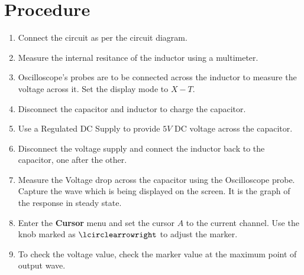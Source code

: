 \documentclass[12pt]{article}
\begin{document}
\section{Procedure}
\begin{enumerate}
    \item Connect the circuit as per the circuit diagram.
    \item Measure the internal resitance of the inductor using a multimeter.
    \item Oscilloscope's probes are to be connected across the inductor to measure the voltage across it. Set the display mode to $X - T$.
    \item Disconnect the capacitor and inductor to charge the capacitor.
    \item Use a Regulated DC Supply to provide $5 V$ DC voltage across the capacitor.
    \item Disconnect the voltage supply and connect the inductor back to the capacitor, one after the other. 
    \item Measure the Voltage drop across the capacitor using the Oscilloscope probe. Capture the wave which is being displayed on the screen. It is the graph of the response in steady state.
    \item Enter the \textbf{Cursor} menu and set the cursor $A$ to the current channel. Use the knob marked as $\lcirclearrowright$ to adjust the marker.
    \item To check the voltage value, check the marker value at the maximum point of output wave.
\end{enumerate}
\end{document}
